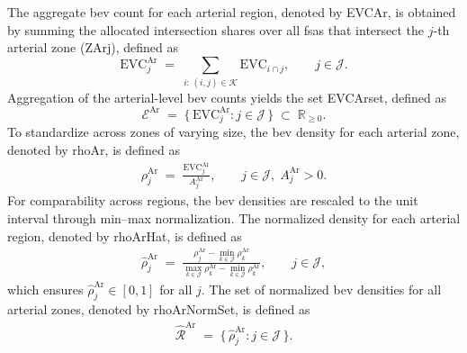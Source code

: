 The aggregate \gls{bev} count for each arterial region, denoted by \gls{EVCAr}, is obtained by summing the allocated intersection shares over all \glspl{fsa} that intersect the $j$-th arterial zone (\gls{ZArj}), defined as
\begin{equation}
  \label{eq:EV_aggregate_arterial}
  \mathrm{EVC}^{\mathrm{Ar}}_{j}
  \;=\;
  \sum_{i:\,(i,j)\in\mathcal{K}} \mathrm{EVC}_{i \cap j},
  \qquad j \in \mathcal{J}.
\end{equation}
Aggregation of the arterial-level \gls{bev} counts yields the set \gls{EVCArset}, defined as
\begin{equation}
  \mathcal{E}^{\mathrm{Ar}}
  \;=\;
  \bigl\{\, \mathrm{EVC}^{\mathrm{Ar}}_{j} : j \in \mathcal{J} \,\bigr\}
  \;\subset\; \mathbb{R}_{\ge 0}.
\end{equation}
To standardize across zones of varying size, the \gls{bev} density for each arterial zone, denoted by \gls{rhoAr}, is defined as
\begin{align}
  \label{eq:EV_density_arterial}
  \rho^{\mathrm{Ar}}_{j}
  \;=\;
  \frac{\mathrm{EVC}^{\mathrm{Ar}}_{j}}{A^{\mathrm{Ar}}_{j}},
  \qquad j \in \mathcal{J}, \; A^{\mathrm{Ar}}_{j}>0.
\end{align}
For comparability across regions, the \gls{bev} densities are rescaled to the unit interval through min–max normalization. The normalized density for each arterial region, denoted by \gls{rhoArHat}, is defined as
\begin{align}
  \label{eq:EV_density_norm}
  \widehat{\rho}^{\mathrm{Ar}}_{j}
   \;=\;
   \frac{\rho^{\mathrm{Ar}}_{j} - \min_{k \in \mathcal{J}} \rho^{\mathrm{Ar}}_{k}}
        {\max_{k \in \mathcal{J}} \rho^{\mathrm{Ar}}_{k} - \min_{k \in \mathcal{J}} \rho^{\mathrm{Ar}}_{k}},
   \qquad j \in \mathcal{J},
\end{align}
which ensures $\widehat{\rho}^{\mathrm{Ar}}_{j} \in [0,1]$ for all $j$. The set of normalized \gls{bev} densities for all arterial zones, denoted by \gls{rhoArNormSet}, is defined as
\begin{align}
  \label{eq:EV_density_norm_set}
  \widehat{\mathcal{R}}^{\mathrm{Ar}}
   \;=\;
   \bigl\{\, 
      \widehat{\rho}^{\mathrm{Ar}}_{j} 
      : j \in \mathcal{J} 
   \,\bigr\}.
\end{align}
